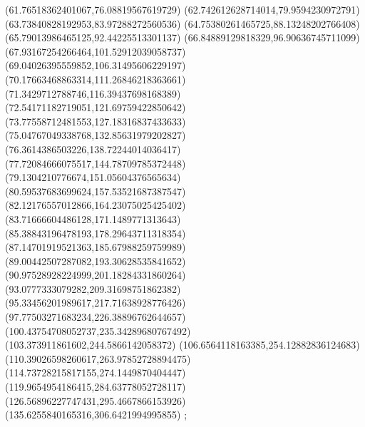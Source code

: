 {(61.76518362401067,76.08819567619729)
(62.742612628714014,79.9594230972791)
(63.73840828192953,83.97288272560536)
(64.75380261465725,88.13248202766408)
(65.79013986465125,92.44225513301137)
(66.84889129818329,96.90636745711099)
(67.93167254266464,101.52912039058737)
(69.04026395559852,106.31495606229197)
(70.17663468863314,111.26846218363661)
(71.3429712788746,116.39437698168389)
(72.54171182719051,121.69759422850642)
(73.77558712481553,127.18316837433633)
(75.04767049338768,132.85631979202827)
(76.3614386503226,138.72244014036417)
(77.72084666075517,144.78709785372448)
(79.1304210776674,151.05604376565634)
(80.59537683699624,157.53521687387547)
(82.12176557012866,164.23075025425402)
(83.71666604486128,171.1489771313643)
(85.38843196478193,178.29643711318354)
(87.14701919521363,185.67988259759989)
(89.00442507287082,193.30628535841652)
(90.97528928224999,201.18284331860264)
(93.0777333079282,209.31698751862382)
(95.33456201989617,217.71638928776426)
(97.77503271683234,226.38896762644657)
(100.43754708052737,235.34289680767492)
(103.373911861602,244.5866142058372)
(106.6564118163385,254.12882836124683)
(110.39026598260617,263.97852728894475)
(114.73728215817155,274.1449870404447)
(119.9654954186415,284.63778052728117)
(126.56896227747431,295.4667866153926)
(135.6255840165316,306.6421994995855)
};
